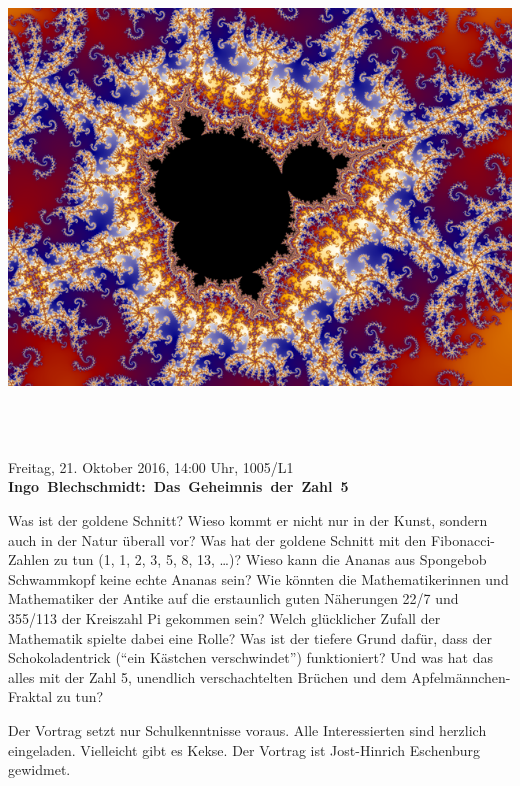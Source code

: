 \documentclass[a4paper,ngerman,landscape]{scrartcl}
\begin{document}
\begin{center}
\begin{minipage}[b]{0.25\textwidth}
  \bigskip
  \bigskip
  \includegraphics[height=0.32\textheight,angle=90]{mandelbrot}
  \end{minipage}
  \vfill
  \newpage
  \vspace*{1.5em}
  \Huge
   \\[0.8em]
   \\[0.8em]
  \vspace{0.2em}

  Freitag, 21. Oktober 2016, 14:00 Uhr, 1005/L1 \\
  \mbox{\textbf{Ingo Blechschmidt: Das Geheimnis der Zahl 5}}
  \vspace{1em}

  \huge
  \begin{minipage}{0.99\textwidth}
    \setlength\parskip{\medskipamount}
    Was ist der goldene Schnitt? Wieso kommt er nicht nur in der Kunst, sondern
    auch in der Natur überall vor? Was hat der goldene Schnitt mit den
    Fibonacci-Zahlen zu tun (1, 1, 2, 3, 5, 8, 13, \ldots)? Wieso kann die Ananas
    aus Spongebob Schwammkopf keine echte Ananas sein? Wie könnten die
    Mathematikerinnen und Mathematiker der Antike auf die erstaunlich guten
    Näherungen 22/7 und 355/113 der Kreiszahl Pi gekommen sein? Welch
    glücklicher Zufall der Mathematik spielte dabei eine Rolle? Was ist der
    tiefere Grund dafür, dass der Schokoladentrick ("`ein Kästchen
    verschwindet"') funktioniert? Und was hat das alles mit der Zahl 5,
    unendlich verschachtelten Brüchen und dem Apfelmännchen-Fraktal zu tun?

    Der Vortrag setzt nur Schulkenntnisse voraus. Alle Interessierten sind
    herzlich eingeladen. Vielleicht gibt es Kekse. Der Vortrag ist Jost-Hinrich
    Eschenburg gewidmet.
    \vspace{0.3em}
  \end{minipage}
\end{center}
\end{document}
